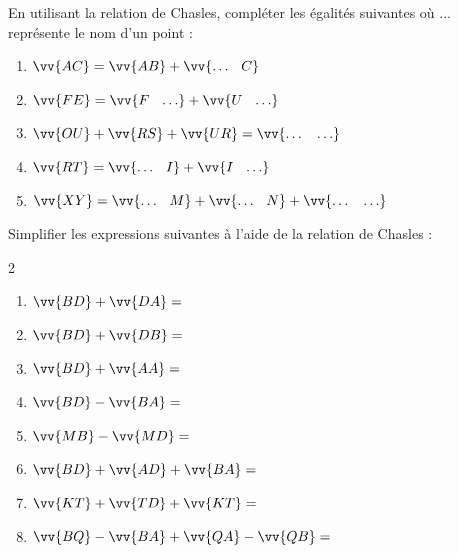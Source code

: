 \documentclass[main.tex]{subfiles}
\begin{document}
\begin{example} En utilisant la relation de Chasles, compléter les égalités suivantes où \og $\ldots$\fg{}  représente le nom d'un point :

\begin{enumerate}[label=\alph*)]
\item\rule{0pt}{1.8em} $\vv{AC}=\vv{AB}+\vv{\ldots\phantom{A} C}$ %

\item\rule{0pt}{1.8em} $\vv{FE}=\vv{F\phantom{A}\ldots}+\vv{U\phantom{A}\ldots }$

\item\rule{0pt}{1.8em} $\vv{OU}+\vv{RS}+\vv{UR}=\vv{\ldots\phantom{A}\ldots }$

\item\rule{0pt}{1.8em} $\vv{RT}=\vv{\ldots\phantom{A} I}+\vv{I\phantom{A}\ldots }$

\item\rule{0pt}{1.8em} $\vv{XY}=\vv{\ldots\phantom{A} M}+\vv{\ldots\phantom{A} N}+\vv{\ldots\phantom{A}\ldots }$
\end{enumerate}
\end{example}
\begin{exercise}\label{chap07.exo.chasles01}   
Simplifier les expressions suivantes à l'aide de la relation de Chasles :
\begin{multicols}{2} 
\begin{enumerate} [label=\alph*),leftmargin=*]
\item\rule{0pt}{1.8em} $\vv{BD}+\vv{DA}=\dotfill$
\item\rule{0pt}{1.8em} $\vv{BD}+\vv{DB}=\dotfill$
\item\rule{0pt}{1.8em} $\vv{BD}+\vv{AA}=\dotfill$
\item\rule{0pt}{1.8em} $\vv{BD}-\vv{BA}=\dotfill$
\item\rule{0pt}{1.8em} $\vv{MB}-\vv{MD}=\dotfill$
\item\rule{0pt}{1.8em} $\vv{BD}+\vv{AD}+\vv{BA}=\dotfill$
\item\rule{0pt}{1.8em}  $\vv{KT}+\vv{TD}+\vv{KT}=\dotfill$
\item\rule{0pt}{1.8em}  $\vv{BQ}-\vv{BA}+\vv{QA}-\vv{QB}=\dotfill$
\end{enumerate}
\end{multicols}
\end{exercise}
\end{document}
